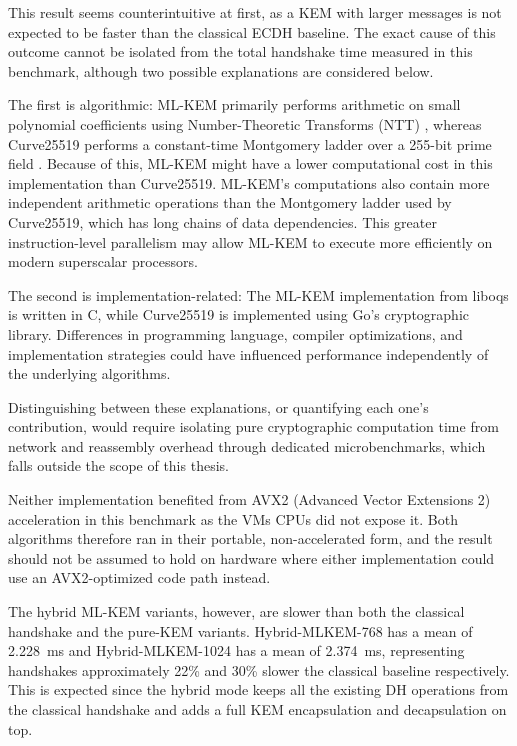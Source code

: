This result seems counterintuitive at first, as a KEM with larger messages is not expected to be faster than the classical ECDH baseline. The exact cause of this outcome cannot be isolated from the total handshake time measured in this benchmark, although two possible explanations are considered below.

The first is algorithmic: ML-KEM primarily performs arithmetic on small polynomial coefficients using Number-Theoretic Transforms (NTT) \cite{mlkem}, whereas Curve25519 performs a constant-time Montgomery ladder over a 255-bit prime field \cite{rfc7748}. Because of this, ML-KEM might have a lower computational cost in this implementation than Curve25519. ML-KEM's computations also contain more independent arithmetic operations than the Montgomery ladder used by Curve25519, which has long chains of data dependencies. This greater instruction-level parallelism may allow ML-KEM to execute more efficiently on modern superscalar processors.

The second is implementation-related: The ML-KEM implementation from liboqs is written in C, while Curve25519 is implemented using Go's cryptographic library. Differences in programming language, compiler optimizations, and implementation strategies could have influenced performance independently of the underlying algorithms.

Distinguishing between these explanations, or quantifying each one's contribution, would require isolating pure cryptographic computation time from network and reassembly overhead through dedicated microbenchmarks, which falls outside the scope of this thesis. 

Neither implementation benefited from AVX2 (Advanced Vector Extensions 2) acceleration \cite{avx2} in this benchmark as the VMs CPUs did not expose it. Both algorithms therefore ran in their portable, non-accelerated form, and the result should not be assumed to hold on hardware where either implementation could use an AVX2-optimized code path instead.

The hybrid ML-KEM variants, however, are slower than both the classical handshake and the pure-KEM variants. Hybrid-MLKEM-768 has a mean of \qty{2.228}{ms} and Hybrid-MLKEM-1024 has a mean of \qty{2.374}{ms}, representing handshakes approximately 22\% and 30\% slower the classical baseline respectively. This is expected since the hybrid mode keeps all the existing DH operations from the classical handshake and adds a full KEM encapsulation and decapsulation on top.


